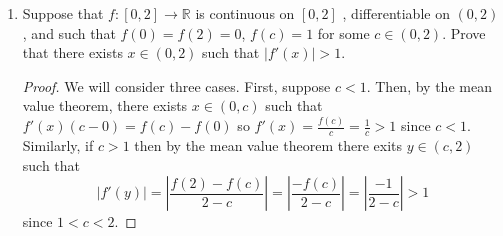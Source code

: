 \documentclass[reqno]{article}
\theoremstyle{remark}
\numberwithin{equation}{section}
\newcommand{\R}{\mathbb{R}}
\begin{document}
\begin{enumerate}
\begin{enumerate}
\item Prove that $X$ is both complete and separable.

\begin{proof}

\end{proof}

\item Suppose $\{x_k\}_{k=1}^\infty \subseteq X$ is a sequence such that the series $\sum_{k=1}^\infty d(x_k, x_{k+1})$ converges. Prove that the sequence $\{x_k\}_{k=1}^\infty$ converges in $X$. 

\begin{proof}

\end{proof} 

\end{enumerate} 

\item Suppose that $f \colon [0,2] \to \R$ is continuous on $[0,2]$ , differentiable on $(0,2)$, and such that $f(0) = f(2) = 0$, $f(c) = 1$ for some $c \in (0,2)$. Prove that there exists $x \in (0,2)$ such that $|f'(x)| >1.$

\begin{proof}
    We will consider three cases. First, suppose $c<1$. Then, by the mean value theorem, there exists $x\in (0,c)$ such that $f'(x)(c-0)=f(c)-f(0)$ so $f'(x)=\frac{f(c)}{c}=\frac{1}{c}>1$ since $c<1$. Similarly, if $c>1$ then by the mean value theorem there exits $y\in (c,2)$ such that \[|f'(y)|=\left\lvert\frac{f(2)-f(c)}{2-c}\right\rvert=\left\lvert \frac{-f(c)}{2-c}\right\rvert=\left\lvert\frac{-1}{2-c}\right\rvert>1\]
    since $1<c<2$.
    

\end{proof}
\end{enumerate}
\end{document}
